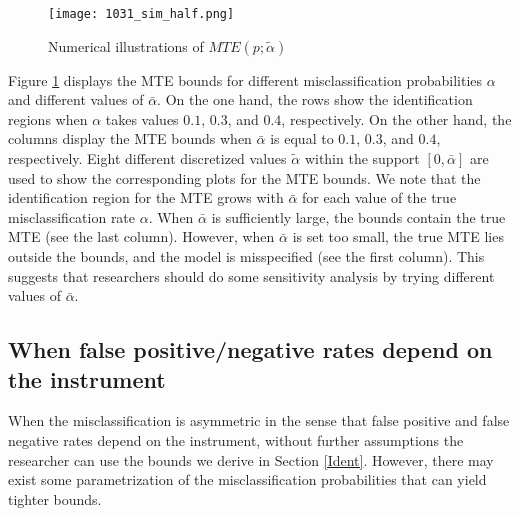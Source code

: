 \documentclass[11pt,reqno]{amsart}
\theoremstyle{plain}
\numberwithin{equation}{section}
\begin{document}
\begin{figure}[h]
    \begin{minipage}{\textwidth}
    \texttt{[image: 1031\_sim\_half.png]}
    \centering
    \caption{Numerical illustrations of $MTE(p;\tilde{\alpha})$}
    \label{fig.0127A_half}
    \end{minipage}
\end{figure}


Figure \ref{fig.0127A_half} displays the MTE bounds for different misclassification probabilities $\alpha$ and different values of $\bar{\alpha}$. On the one hand, the rows show the identification regions when $\alpha$ takes values $0.1$, $0.3$, and $0.4$, respectively. On the other hand, the columns display the MTE bounds when $\bar{\alpha}$ is equal to $0.1$, $0.3$, and $0.4$, respectively. 
Eight different discretized values $\tilde{\alpha}$ within the support $[0,\bar{\alpha}]$ are used to show the corresponding plots for the MTE bounds.
We note that the identification region for the MTE grows with $\bar{\alpha}$ for each value of the true misclassification rate $\alpha$. When $\bar{\alpha}$ is sufficiently large, the bounds contain the true MTE (see the last column). However, when $\bar{\alpha}$ is set too small, the true MTE lies outside the bounds, and the model is misspecified (see the first column). This suggests that researchers should do some sensitivity analysis by trying different values of $\bar{\alpha}$.

\subsection{When false positive/negative rates depend on the instrument}\label{semipara}
When the misclassification is asymmetric in the sense that false positive and false negative rates depend on the instrument, without further assumptions the researcher can use the bounds we derive in Section \ref{Ident}. However, there may exist some parametrization of the misclassification probabilities that can yield tighter bounds. 
\end{document}
